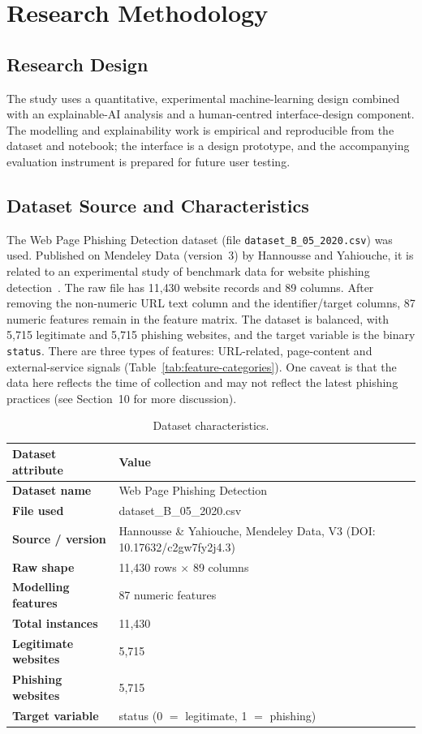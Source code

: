 \documentclass[11pt,a4paper]{article}
\begin{document}
\section{Research Methodology}

\subsection{Research Design}

The study uses a quantitative, experimental machine-learning design combined with an
explainable-AI analysis and a human-centred interface-design component. The modelling and
explainability work is empirical and reproducible from the dataset and notebook; the
interface is a design prototype, and the accompanying evaluation instrument is prepared for
future user testing.

\subsection{Dataset Source and Characteristics}

The Web Page Phishing Detection dataset (file \texttt{dataset\_B\_05\_2020.csv}) was used.
Published on Mendeley Data (version~3) by Hannousse and Yahiouche, it is related to an
experimental study of benchmark data for website phishing detection~\cite{ref1,ref2}. The raw
file has 11{,}430 website records and 89 columns. After removing the non-numeric URL text
column and the identifier/target columns, 87 numeric features remain in the feature matrix.
The dataset is balanced, with 5{,}715 legitimate and 5{,}715 phishing websites, and the target
variable is the binary \texttt{status}. There are three types of features: URL-related,
page-content and external-service signals (Table~\ref{tab:feature-categories}). One caveat is
that the data here reflects the time of collection and may not reflect the latest phishing
practices (see Section~10 for more discussion).

\begin{table}[H]
\caption{Dataset characteristics.}
\label{tab:dataset}
\centering\footnotesize
\begin{tabularx}{\textwidth}{>{\bfseries}p{5cm} L}
\toprule
Dataset attribute & Value \\
\midrule
Dataset name & Web Page Phishing Detection \\
File used & dataset\_B\_05\_2020.csv \\
Source / version & Hannousse \& Yahiouche, Mendeley Data, V3 (DOI: 10.17632/c2gw7fy2j4.3) \\
Raw shape & 11{,}430 rows $\times$ 89 columns \\
Modelling features & 87 numeric features \\
Total instances & 11{,}430 \\
Legitimate websites & 5{,}715 \\
Phishing websites & 5{,}715 \\
Target variable & status (0 $=$ legitimate, 1 $=$ phishing) \\
\bottomrule
\end{tabularx}
\end{table}
\end{document}
